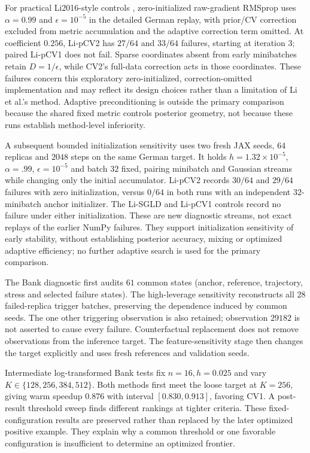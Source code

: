For practical Li2016-style controls \citep{li2016psgld}, zero-initialized raw-gradient RMSprop uses $\alpha=0.99$ and $\epsilon=10^{-5}$ in the detailed German replay, with prior/CV correction excluded from metric accumulation and the adaptive correction term omitted. At coefficient $0.256$, Li-pCV2 has $27/64$ and $33/64$ failures, starting at iteration $3$; paired Li-pCV1 does not fail. Sparse coordinates absent from early minibatches retain $D=1/\epsilon$, while CV2's full-data correction acts in those coordinates. These failures concern this exploratory zero-initialized, correction-omitted implementation and may reflect its design choices rather than a limitation of Li et al.'s method. Adaptive preconditioning is outside the primary comparison because the shared fixed metric controls posterior geometry, not because these runs establish method-level inferiority.


A subsequent bounded initialization sensitivity uses two fresh JAX seeds, $64$ replicas and $2048$ steps on the same German target. It holds $h=1.32\times10^{-5}$, $\alpha=.99$, $\epsilon=10^{-5}$ and batch $32$ fixed, pairing minibatch and Gaussian streams while changing only the initial accumulator. Li-pCV2 records $30/64$ and $29/64$ failures with zero initialization, versus $0/64$ in both runs with an independent $32$-minibatch anchor initializer. The Li-SGLD and Li-pCV1 controls record no failure under either initialization. These are new diagnostic streams, not exact replays of the earlier NumPy failures. They support initialization sensitivity of early stability, without establishing posterior accuracy, mixing or optimized adaptive efficiency; no further adaptive search is used for the primary comparison.

The Bank diagnostic first audits $61$ common states (anchor, reference, trajectory, stress and selected failure states). The high-leverage sensitivity reconstructs all $28$ failed-replica trigger batches, preserving the dependence induced by common seeds. The one other triggering observation is also retained; observation $29182$ is not asserted to cause every failure. Counterfactual replacement does not remove observations from the inference target. The feature-sensitivity stage then changes the target explicitly and uses fresh references and validation seeds.

Intermediate log-transformed Bank tests fix $n=16,h=0.025$ and vary $K\in\{128,256,384,512\}$. Both methods first meet the loose target at $K=256$, giving warm speedup $0.876$ with interval $[0.830,0.913]$, favoring CV1. A post-result threshold sweep finds different rankings at tighter criteria. These fixed-configuration results are preserved rather than replaced by the later optimized positive example. They explain why a common threshold or one favorable configuration is insufficient to determine an optimized frontier.


